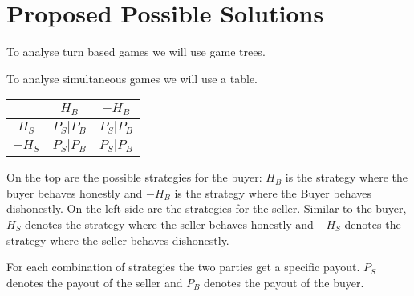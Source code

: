 \documentclass{cacthesis}
\begin{document}
\chapter{Proposed Possible Solutions}
To analyse turn based games we will use game trees. 

To analyse simultaneous games we will use a table.
\begin{center}
\begin{tabular}{ c||c|c| }
& $H_B$ & $-H_B$  \\
\hline
\hline
$H_S$ & $P_S | P_B$ & $P_S | P_B$ \\
\hline
$-H_S$ & $P_S | P_B$ & $P_S | P_B$ \\ 
\hline
\end{tabular}
\end{center}

 On the top are the possible strategies for the buyer: $H_B$ is the strategy where the buyer behaves honestly and $-H_B$ is the strategy where the Buyer behaves dishonestly.\newline
On the left side are the strategies for the seller. Similar to the buyer, $H_S$ denotes the strategy where the seller behaves honestly and $-H_S$ denotes the strategy where the seller behaves dishonestly.\newline

For each combination of strategies the two parties get a specific payout. $P_S$ denotes the payout of the seller and $P_B$ denotes the payout of the buyer.
\end{document}
